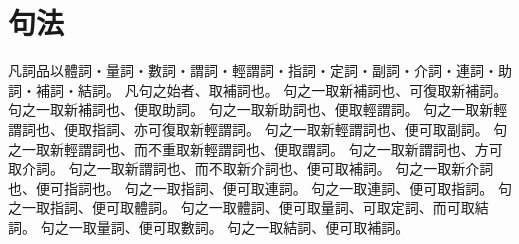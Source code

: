 \chapter{句法}
凡詞品以體詞・量詞・數詞・謂詞・輕謂詞・指詞・定詞・副詞・介詞・連詞・助詞・補詞・結詞。
凡句之始者、取補詞也。
句之一取新補詞也、可復取新補詞。
句之一取新補詞也、便取助詞。
句之一取新助詞也、便取輕謂詞。
句之一取新輕謂詞也、便取指詞、亦可復取新輕謂詞。
句之一取新輕謂詞也、便可取副詞。
句之一取新輕謂詞也、而不重取新輕謂詞也、便取謂詞。
句之一取新謂詞也、方可取介詞。
句之一取新謂詞也、而不取新介詞也、便可取補詞。
句之一取新介詞也、便可指詞也。
句之一取指詞、便可取連詞。
句之一取連詞、便可取指詞。
句之一取指詞、便可取體詞。
句之一取體詞、便可取量詞、可取定詞、而可取結詞。
句之一取量詞、便可取數詞。
句之一取結詞、便可取補詞。

